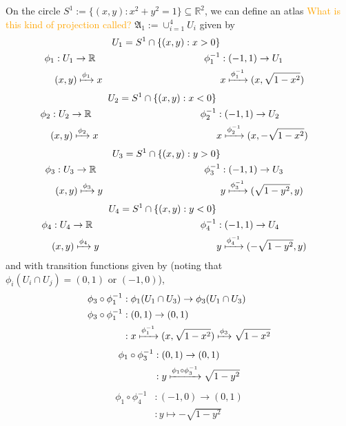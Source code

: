 \documentclass[a4paper]{article}
\theoremstyle{definition} \newtheorem*{definition}{Definition}
\theoremstyle{definition} \newtheorem*{definitions}{Definitions}
\theoremstyle{plain} \newtheorem{theorem}{Theorem}[section]
\theoremstyle{plain} \newtheorem{proposition}[theorem]{Proposition}
\theoremstyle{plain} \newtheorem{corollary}[theorem]{Corollary}
\theoremstyle{plain} \newtheorem{lemma}[theorem]{Lemma}
\theoremstyle{plain} \newtheorem{example}[theorem]{Example}
\newcommand{\question}[1]{\textcolor{orange}{#1}}
\newcommand{\realnos}{\mathbb{R}}
\begin{document}
On the circle $S^1:=\{(x, y): x^2+y^2 = 1\}\subseteq \realnos^2$, we can define an atlas \question{What is this kind of projection called?} $\mathfrak{A}_1 :=\cup_{i=1}^4 U_i$ given by 
\begin{align*}
&& U_1 = S^1 \cap \{(x, y): x>0 \} \\
\phi_1 & : U_1\to \realnos &
\phi_1^{-1} & :(-1, 1)\to U_1 \\
& (x,y) \xmapsto{\phi_1} x 
& & x \xmapsto{\phi_1^{-1}} (x, \sqrt{1-x^2})
\end{align*}
\begin{align*}
&& U_2 = S^1 \cap \{(x, y): x<0 \} \\
\phi_2 & : U_2\to \realnos &
\phi_2^{-1} & :(-1, 1)\to U_2 \\
& (x,y) \xmapsto{\phi_2} x 
& & x \xmapsto{\phi_2^{-1}} (x, - \sqrt{1-x^2})
\end{align*}
\begin{align*}
&& U_3 = S^1 \cap \{(x, y): y>0 \} \\
\phi_3 & : U_3\to \realnos &
\phi_3^{-1} & :(-1, 1)\to U_3 \\
& (x,y) \xmapsto{\phi_3} y
& & y \xmapsto{\phi_3^{-1}} (\sqrt{1-y^2}, y)
\end{align*}
\begin{align*}
&& U_4 = S^1 \cap \{(x, y): y<0 \} \\
\phi_4 & : U_4\to \realnos &
\phi_4^{-1} & :(-1, 1)\to U_4 \\
& (x,y) \xmapsto{\phi_4} y
& & y \xmapsto{\phi_4^{-1}} (- \sqrt{1-y^2}, y)
\end{align*}
and with transition functions given by (noting that $\phi_i(U_i\cap U_j) = (0, 1) \text{ or } (-1, 0)$), 
\begin{align*}
\phi_3 \circ \phi_1^{-1} & :\phi_1(U_1\cap U_3)\to \phi_3(U_1 \cap U_3) \\
\phi_3 \circ \phi_1^{-1} & : (0,1) \to (0,1) \\
& : x \xmapsto{\phi_1^{-1}} (x, \sqrt{1-x^2}) \xmapsto{\phi_3} \sqrt{1-x^2}
\end{align*}
\begin{align*}
\phi_1 \circ \phi_3^{-1} & : (0,1) \to (0,1) \\
& : y \xmapsto{\phi_1 \circ \phi_3^{-1}}  \sqrt{1-y^2}
\end{align*}
\begin{align*}
\phi_1 \circ \phi_4^{-1} & : (-1,0) \to (0,1) \\
& : y \mapsto -\sqrt{1-y^2}
\end{align*}
\end{document}
